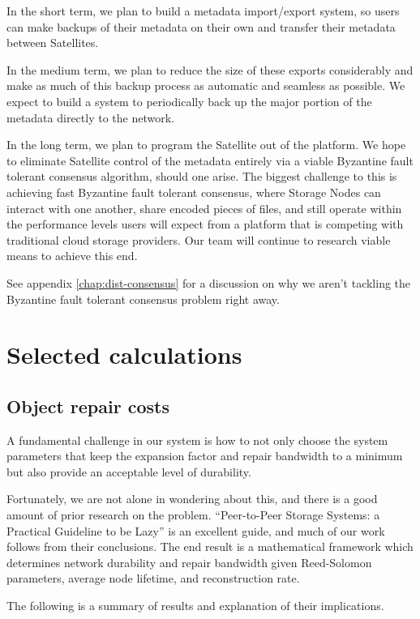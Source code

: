 \documentclass[8pt,fleqn,openany]{book}
\begin{document}
In the short term, we plan to build a metadata import/export system, so users
can make backups of their metadata on their own and transfer their metadata
between Satellites.

In the medium term, we plan to reduce the size of these exports considerably
and make as much of this backup process as automatic and seamless as possible.
We expect to build a system to periodically back up the major portion of the metadata
directly to the network.

In the long term, we plan to program the Satellite out of the platform.
We hope to eliminate Satellite control of the metadata
entirely via a viable Byzantine fault tolerant consensus algorithm, should
one arise.
The biggest challenge to this is achieving fast Byzantine fault tolerant
consensus, where Storage Nodes can interact with one another, share encoded
pieces of files, and still operate within the performance levels users will
expect from a platform that is competing with traditional cloud storage
providers. Our team will continue to research viable means to achieve this end.

See appendix \ref{chap:dist-consensus} for a discussion on why
we aren't tackling the Byzantine fault tolerant consensus problem right away.

\chapter{Selected calculations}\label{chap:selected-calcs}

\section{Object repair costs}

A fundamental challenge in our system is how to not only choose the system
parameters that keep the expansion factor and repair bandwidth to a minimum but
also provide an acceptable level of durability.

Fortunately, we are not alone in wondering about this, and there is a good
amount of prior research on the problem.
``Peer-to-Peer Storage Systems: a Practical Guideline to be Lazy'' \cite{p2p-lazy} is an excellent guide, and much of our work follows from their conclusions.
The end result is a mathematical framework which determines network durability
and repair bandwidth given Reed-Solomon parameters, average node lifetime, and
reconstruction rate.

The following is a summary of results and explanation of their implications.
\end{document}
